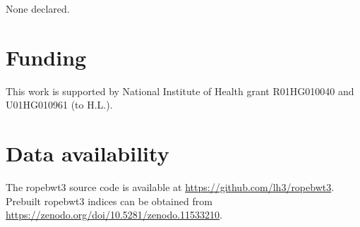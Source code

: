 \documentclass[webpdf,contemporary,large,namedate]{oup-authoring-template}%
\begin{document}
None declared.

\section*{Funding}

This work is supported by National Institute of Health grant R01HG010040 and U01HG010961 (to H.L.).

\section*{Data availability}

The ropebwt3 source code is available at \url{https://github.com/lh3/ropebwt3}.
Prebuilt ropebwt3 indices can be obtained from \url{https://zenodo.org/doi/10.5281/zenodo.11533210}.


{\sffamily\small
}
\end{document}
